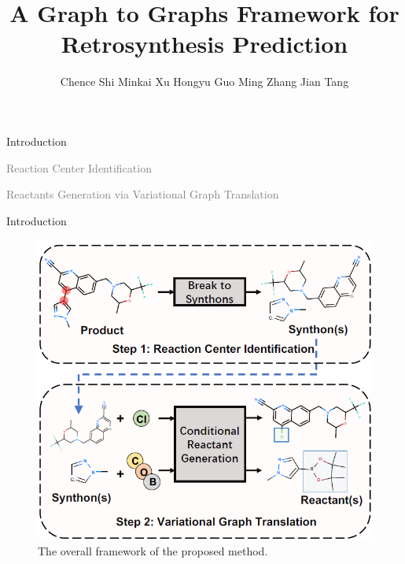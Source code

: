 \documentclass{beamer}		%
\title[A Graph to Graphs Framework for Retrosynthesis Prediction]{A Graph to Graphs Framework for Retrosynthesis Prediction}	%
\author[Shen Yuan]{Chence Shi \quad Minkai Xu \quad Hongyu Guo \quad Ming Zhang \quad Jian Tang} %
\begin{document}


\newcommand{\light}[1]{\textcolor{gray}{#1}}

\begin{frame}	

\titlepage	%
	
\end{frame}	




\begin{frame}[noframenumbering]

\begin{itemize}

    \begin{LARGE}
    
    \item Introduction
    
    \item \light{Reaction Center Identification}
    
    \item \light{Reactants Generation via Variational Graph Translation}

    \end{LARGE}
    
\end{itemize}
	
\end{frame}





\begin{frame}{Introduction}


\begin{figure}[t]
\centerline{\includegraphics[width=0.6\linewidth]{figure1.png}}
\label{fig1}
\caption{The overall framework of the proposed method.}
\end{figure}


\end{frame}
\end{document}
